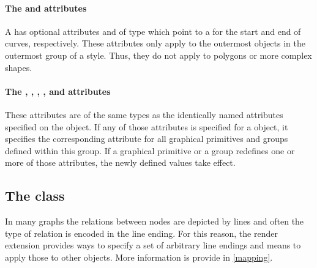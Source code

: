 \paragraph{The \fixttspace{} and \fixttspace{} attributes}

A \RenderGroup has optional attributes  and  of type
 which point to a \LineEnding for the start and end of curves, respectively. 
These attributes only apply to the outermost \RenderCurve objects in the outermost group of a style. 
Thus, they do not apply to polygons or more complex shapes. 

\paragraph{The \fixttspace{}, \fixttspace{}, \fixttspace{} , \fixttspace{},  \fixttspace{} and \fixttspace{} attributes}

These attributes are of the same types as the identically named attributes specified on the \Text object.   If any of those attributes is specified for a \RenderGroup object, it 
specifies the corresponding attribute for all graphical primitives and groups 
defined within this group. If a graphical primitive or a group redefines one or 
more of those attributes, the newly defined values take effect.

\subsection{The  class}
\label{lineending-class}

In many graphs the relations between nodes are depicted by lines and often the 
type of relation is encoded in the line ending. For this reason, the render
extension provides ways to specify a set of arbitrary line endings and means to
apply those to other objects. More information is provide in \ref{mapping}.

